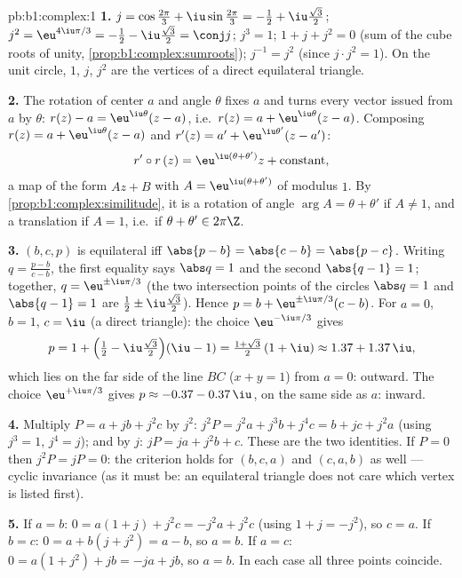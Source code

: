 \begin{solution}{pb:b1:complex:1}
\textbf{1.} $j = \cos\frac{2\pi}3 + \iu\sin\frac{2\pi}3 = -\frac12
+ \iu\frac{\sqrt3}2$; $j^2 = \eu^{4\iu\pi/3} = -\frac12 -
\iu\frac{\sqrt3}2 = \conj j$; $j^3 = 1$; $1 + j + j^2 = 0$ (sum of
the cube roots of unity, \cref{prop:b1:complex:sumroots}); $j^{-1}
= j^2$ (since $j \cdot j^2 = 1$). On the unit circle, $1$, $j$,
$j^2$ are the vertices of a direct equilateral triangle.

\textbf{2.} The rotation of center $a$ and angle $\theta$ fixes $a$
and turns every vector issued from $a$ by $\theta$: $r(z) - a =
\eu^{\iu\theta}(z - a)$, i.e.\ $r(z) = a + \eu^{\iu\theta}(z - a)$.
Composing $r(z) = a + \eu^{\iu\theta}(z-a)$ and $r'(z) = a' +
\eu^{\iu\theta'}(z-a')$:
\[
r' \circ r\,(z) = \eu^{\iu(\theta + \theta')} z +
\text{constant},
\]
a map of the form $Az + B$ with $A = \eu^{\iu(\theta+\theta')}$ of
modulus $1$. By \cref{prop:b1:complex:similitude}, it is a rotation
of angle $\arg A = \theta + \theta'$ if $A \neq 1$, and a
translation if $A = 1$, i.e.\ if $\theta + \theta' \in 2\pi\Z$.

\textbf{3.} $(b, c, p)$ is equilateral iff $\abs{p - b} = \abs{c -
b} = \abs{p - c}$. Writing $q = \frac{p - b}{c - b}$, the first
equality says $\abs q = 1$ and the second $\abs{q - 1} = 1$;
together, $q = \eu^{\pm\iu\pi/3}$ (the two intersection points of
the circles $\abs q = 1$ and $\abs{q - 1} = 1$ are $\frac12 \pm
\iu\frac{\sqrt3}2$). Hence $p = b + \eu^{\pm\iu\pi/3}(c - b)$. For
$a = 0$, $b = 1$, $c = \iu$ (a direct triangle): the choice
$\eu^{-\iu\pi/3}$ gives
\[
p = 1 + \Bigl(\tfrac12 - \iu\tfrac{\sqrt3}2\Bigr)(\iu - 1)
= \tfrac{1 + \sqrt3}2\,(1 + \iu) \approx 1.37 + 1.37\,\iu ,
\]
which lies on the far side of the line $BC$ ($x + y = 1$) from $a
= 0$: outward. The choice $\eu^{+\iu\pi/3}$ gives $p \approx -0.37
- 0.37\,\iu$, on the same side as $a$: inward.

\textbf{4.} Multiply $P = a + jb + j^2c$ by $j^2$: $j^2 P = j^2 a +
j^3 b + j^4 c = b + jc + j^2 a$ (using $j^3 = 1$, $j^4 = j$); and
by $j$: $jP = ja + j^2 b + c$. These are the two identities. If $P
= 0$ then $j^2 P = jP = 0$: the criterion holds for $(b, c, a)$ and
$(c, a, b)$ as well --- cyclic invariance (as it must be: an
equilateral triangle does not care which vertex is listed first).

\textbf{5.} If $a = b$: $0 = a(1 + j) + j^2 c = -j^2 a + j^2 c$
(using $1 + j = -j^2$), so $c = a$. If $b = c$: $0 = a + b(j + j^2)
= a - b$, so $a = b$. If $a = c$: $0 = a(1 + j^2) + jb = -ja + jb$,
so $a = b$. In each case all three points coincide.


\end{solution}

